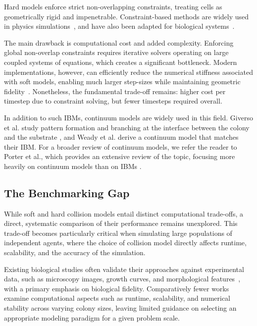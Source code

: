 \documentclass[a4paper,fleqn]{cas-dc}
\begin{document}
\begin{description}[style=nextline]
    \item[Hard (Constraint-Based) Models]
        Hard models enforce strict non-overlapping constraints, treating cells as geometrically rigid and impenetrable. Constraint-based methods are widely used in physics simulations~\cite{Tasora2008,Macklin2014,Li2021,Ferguson2021,Yan_2020}, and have also been adapted for biological systems~\cite{Rudge2012,Weady2024,Yan2019}.

        The main drawback is computational cost and added complexity. Enforcing global non-overlap constraints requires iterative solvers operating on large coupled systems of equations, which creates a significant bottleneck. Modern implementations, however, can efficiently reduce the numerical stiffness associated with soft models, enabling much larger step-sizes while maintaining geometric fidelity~\cite{Yan2019}. Nonetheless, the fundamental trade-off remains: higher cost per timestep due to constraint solving, but fewer timesteps required overall.
\end{description}

In addition to such IBMs, continuum models are widely used in this field. Giverso et al. study pattern formation and branching at the interface between the colony and the substrate \cite{Giverso2015}, and Weady et al. \cite{Weady2024} derive a continuum model that matches their IBM. For a broader review of continuum models, we refer the reader to Porter et al., which provides an extensive review of the topic, focusing more heavily on continuum models than on IBMs \cite{porter2025growth}. 

\subsection{The Benchmarking Gap}

While soft and hard collision models entail distinct computational trade-offs, a direct, systematic comparison of their performance remains unexplored. This trade-off becomes particularly critical when simulating large populations of independent agents, where the choice of collision model directly affects runtime, scalability, and the accuracy of the simulation.

Existing biological studies often validate their approaches against experimental data, such as microscopy images, growth curves, and morphological features~\cite{Rudge2012,Weady2024,Blanchard2015,Ghosh2015,You2018,Warren2019,Khan_2024,You_2021,Valdez2025,Rudge2013,Langeslay_2023}, with a primary emphasis on biological fidelity. Comparatively fewer works examine computational aspects such as runtime, scalability, and numerical stability across varying colony sizes, leaving limited guidance on selecting an appropriate modeling paradigm for a given problem scale.
\end{document}
